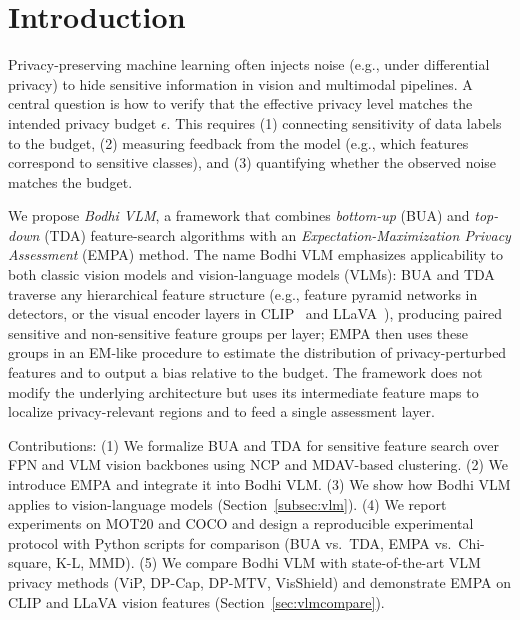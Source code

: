 \documentclass[journal,transmag]{IEEEtran}
\begin{document}
\maketitle
\IEEEdisplaynontitleabstractindextext
\IEEEpeerreviewmaketitle

\section{Introduction}
\label{sec:intro}

Privacy-preserving machine learning often injects noise (e.g., under differential privacy) to hide sensitive information in vision and multimodal pipelines. A central question is how to verify that the effective privacy level matches the intended privacy budget $\epsilon$. This requires (1) connecting sensitivity of data labels to the budget, (2) measuring feedback from the model (e.g., which features correspond to sensitive classes), and (3) quantifying whether the observed noise matches the budget.

We propose \emph{Bodhi VLM}, a framework that combines \emph{bottom-up} (BUA) and \emph{top-down} (TDA) feature-search algorithms with an \emph{Expectation-Maximization Privacy Assessment} (EMPA) method. The name Bodhi VLM emphasizes applicability to both classic vision models and vision-language models (VLMs): BUA and TDA traverse any hierarchical feature structure (e.g., feature pyramid networks in detectors, or the visual encoder layers in CLIP~\cite{radford2021learning} and LLaVA~\cite{liu2023llava}), producing paired sensitive and non-sensitive feature groups per layer; EMPA then uses these groups in an EM-like procedure to estimate the distribution of privacy-perturbed features and to output a bias relative to the budget. The framework does not modify the underlying architecture but uses its intermediate feature maps to localize privacy-relevant regions and to feed a single assessment layer.

Contributions: (1) We formalize BUA and TDA for sensitive feature search over FPN and VLM vision backbones using NCP and MDAV-based clustering. (2) We introduce EMPA and integrate it into Bodhi VLM. (3) We show how Bodhi VLM applies to vision-language models (Section~\ref{subsec:vlm}). (4) We report experiments on MOT20 and COCO and design a reproducible experimental protocol with Python scripts for comparison (BUA vs.\ TDA, EMPA vs.\ Chi-square, K-L, MMD). (5) We compare Bodhi VLM with state-of-the-art VLM privacy methods (ViP, DP-Cap, DP-MTV, VisShield) and demonstrate EMPA on CLIP and LLaVA vision features (Section~\ref{sec:vlmcompare}).
\end{document}
